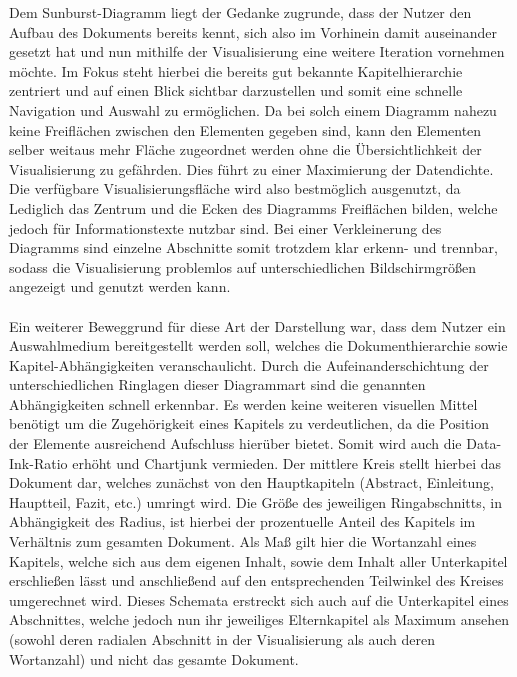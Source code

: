 Dem Sunburst-Diagramm liegt der Gedanke zugrunde, dass der Nutzer den Aufbau des Dokuments bereits kennt, sich also im Vorhinein damit auseinander gesetzt hat und nun mithilfe der Visualisierung eine weitere Iteration vornehmen m\"ochte. Im Fokus steht hierbei die bereits gut bekannte Kapitelhierarchie zentriert und auf einen Blick sichtbar darzustellen und somit eine schnelle Navigation und Auswahl zu erm\"oglichen. Da bei solch einem Diagramm nahezu keine Freifl\"achen zwischen den Elementen gegeben sind, kann den Elementen selber weitaus mehr Fl\"ache zugeordnet werden ohne die \"Ubersichtlichkeit der Visualisierung zu gef\"ahrden. Dies f\"uhrt zu einer Maximierung der Datendichte. Die verf\"ugbare Visualisierungsfl\"ache wird also bestm\"oglich ausgenutzt, da Lediglich das Zentrum und die Ecken des Diagramms Freifl\"achen bilden, welche jedoch f\"ur Informationstexte nutzbar sind. Bei einer Verkleinerung des Diagramms sind einzelne Abschnitte somit trotzdem klar erkenn- und trennbar, sodass die Visualisierung problemlos auf unterschiedlichen Bildschirmgr\"o{\ss}en angezeigt und genutzt werden kann.\\
\\
Ein weiterer Beweggrund f\"ur diese Art der Darstellung war, dass dem Nutzer ein Auswahlmedium bereitgestellt werden soll, welches die Dokumenthierarchie sowie Kapitel-Abh\"angigkeiten veranschaulicht. Durch die Aufeinanderschichtung der unterschiedlichen Ringlagen dieser Diagrammart sind die genannten Abh\"angigkeiten schnell erkennbar. Es werden keine weiteren visuellen Mittel ben\"otigt um die Zugeh\"origkeit eines Kapitels zu verdeutlichen, da die Position der Elemente ausreichend Aufschluss hier\"uber bietet. Somit wird auch die Data-Ink-Ratio erh\"oht und Chartjunk vermieden. Der mittlere Kreis stellt hierbei das Dokument dar, welches zun\"achst von den Hauptkapiteln (Abstract, Einleitung, Hauptteil, Fazit, etc.) umringt wird. Die Gr\"o{\ss}e des jeweiligen Ringabschnitts, in Abh\"angigkeit des Radius, ist hierbei der prozentuelle Anteil des Kapitels im Verh\"altnis zum gesamten Dokument. Als Ma{\ss} gilt hier die Wortanzahl eines Kapitels, welche sich aus dem eigenen Inhalt, sowie dem Inhalt aller Unterkapitel erschlie{\ss}en l\"asst und anschlie{\ss}end auf den entsprechenden Teilwinkel des Kreises umgerechnet wird. Dieses Schemata erstreckt sich auch auf die Unterkapitel eines Abschnittes, welche jedoch nun ihr jeweiliges Elternkapitel als Maximum ansehen (sowohl deren radialen Abschnitt in der Visualisierung als auch deren Wortanzahl) und nicht das gesamte Dokument.\\
